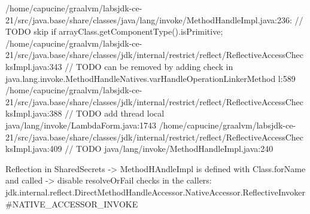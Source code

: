 /home/capucine/graalvm/labsjdk-ce-21/src/java.base/share/classes/java/lang/invoke/MethodHandleImpl.java:236:             // TODO skip if arrayClass.getComponentType().isPrimitive;
/home/capucine/graalvm/labsjdk-ce-21/src/java.base/share/classes/jdk/internal/restrict/reflect/ReflectiveAccessChecksImpl.java:343 // TODO can be removed by adding check in java.lang.invoke.MethodHandleNatives.varHandleOperationLinkerMethod l:589    
/home/capucine/graalvm/labsjdk-ce-21/src/java.base/share/classes/jdk/internal/restrict/reflect/ReflectiveAccessChecksImpl.java:388  // TODO add thread local java/lang/invoke/LambdaForm.java:1743
/home/capucine/graalvm/labsjdk-ce-21/src/java.base/share/classes/jdk/internal/restrict/reflect/ReflectiveAccessChecksImpl.java:409 // TODO java/lang/invoke/MethodHandleImpl.java:240

Reflection in SharedSecrets -> MethodHAndleImpl is defined with Class.forName and called -> disable resolveOrFail checks in the callers: jdk.internal.reflect.DirectMethodHandleAccessor.NativeAccessor.ReflectiveInvoker#NATIVE_ACCESSOR_INVOKE

